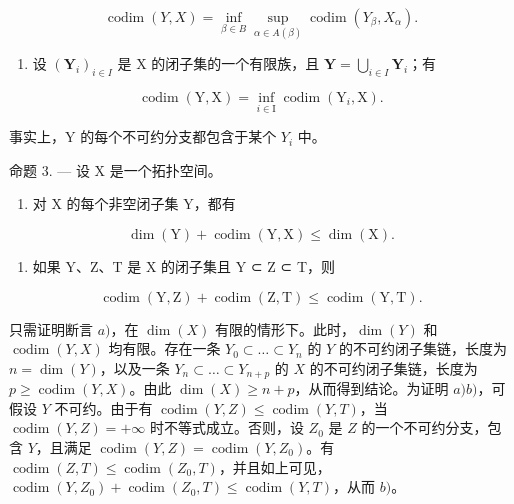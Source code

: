 \[
\operatorname{codim} (Y, X) = \inf _ {\beta \in B} \sup _ {\alpha \in A (\beta)} \operatorname{codim} (Y _ {\beta}, X _ {\alpha}).
\]

\begin{enumerate}
\def\labelenumi{\arabic{enumi})}
\setcounter{enumi}{3}
\tightlist
\item
  设 \((\mathbf{Y}_i)_{i\in I}\) 是 X 的闭子集的一个有限族，且 \(\mathbf{Y} = \bigcup_{i\in I}\mathbf{Y}_i\)；有
\end{enumerate}

\[
\operatorname{codim} (\mathrm{Y}, \mathrm{X}) = \inf _ {i \in \mathrm{I}} \operatorname{codim} (\mathrm{Y} _ {i}, \mathrm{X}).
\]

事实上，Y 的每个不可约分支都包含于某个 \(Y_{i}\) 中。

命题 3. --- 设 X 是一个拓扑空间。

\begin{enumerate}
\def\labelenumi{\alph{enumi})}
\tightlist
\item
  对 X 的每个非空闭子集 Y，都有
\end{enumerate}

\[
\dim (\mathrm{Y}) + \operatorname{codim} (\mathrm{Y}, \mathrm{X}) \leqslant \dim (\mathrm{X}).
\]

\begin{enumerate}
\def\labelenumi{\alph{enumi})}
\setcounter{enumi}{1}
\tightlist
\item
  如果 Y、Z、T 是 X 的闭子集且 Y ⊂ Z ⊂ T，则
\end{enumerate}

\[
\operatorname{codim} (\mathrm{Y}, \mathrm{Z}) + \operatorname{codim} (\mathrm{Z}, \mathrm{T}) \leqslant \operatorname{codim} (\mathrm{Y}, \mathrm{T}).
\]

只需证明断言 \(a)\)，在 \(\dim(X)\) 有限的情形下。此时，\(\dim(Y)\) 和 \(\operatorname{codim}(Y, X)\) 均有限。存在一条 \(Y_0 \subset \ldots \subset Y_n\) 的 \(Y\) 的不可约闭子集链，长度为 \(n = \dim(Y)\)，以及一条 \(Y_n \subset \ldots \subset Y_{n+p}\) 的 \(X\) 的不可约闭子集链，长度为 \(p \geqslant \operatorname{codim}(Y, X)\)。由此 \(\dim(X) \geqslant n + p\)，从而得到结论。为证明 \(a)\)\(b)\)，可假设 \(Y\) 不可约。由于有 \(\operatorname{codim}(Y, Z) \leqslant \operatorname{codim}(Y, T)\)，当 \(\operatorname{codim}(Y, Z) = +\infty\) 时不等式成立。否则，设 \(Z_0\) 是 \(Z\) 的一个不可约分支，包含 \(Y\)，且满足 \(\operatorname{codim}(Y, Z) = \operatorname{codim}(Y, Z_0)\)。有 \(\operatorname{codim}(Z, T) \leqslant \operatorname{codim}(Z_0, T)\)，并且如上可见，\(\operatorname{codim}(Y, Z_0) + \operatorname{codim}(Z_0, T) \leqslant \operatorname{codim}(Y, T)\)，从而 \(b)\)。

